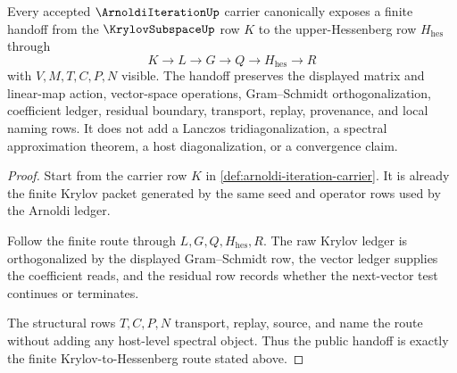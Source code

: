 \begin{theorem}
\label{thm:arnoldi-iteration-krylov-hessenberg-handoff}
Every accepted $\ArnoldiIterationUp$ carrier canonically exposes a finite handoff from the $\KrylovSubspaceUp$ row $K$ to the upper-Hessenberg row $H_{\mathrm{hes}}$ through
$$
K \to L \to G \to Q \to H_{\mathrm{hes}} \to R
$$
with $V,M,T,C,P,N$ visible. The handoff preserves the displayed matrix and linear-map action, vector-space operations, Gram--Schmidt orthogonalization, coefficient ledger, residual boundary, transport, replay, provenance, and local naming rows. It does not add a Lanczos tridiagonalization, a spectral approximation theorem, a host diagonalization, or a convergence claim.
\end{theorem}
\begin{proof}
Start from the carrier row $K$ in \autoref{def:arnoldi-iteration-carrier}. It is already the finite Krylov packet generated by the same seed and operator rows used by the Arnoldi ledger.

Follow the finite route through $L,G,Q,H_{\mathrm{hes}},R$. The raw Krylov ledger is orthogonalized by the displayed Gram--Schmidt row, the vector ledger supplies the coefficient reads, and the residual row records whether the next-vector test continues or terminates.

The structural rows $T,C,P,N$ transport, replay, source, and name the route without adding any host-level spectral object. Thus the public handoff is exactly the finite Krylov-to-Hessenberg route stated above.
\end{proof}




